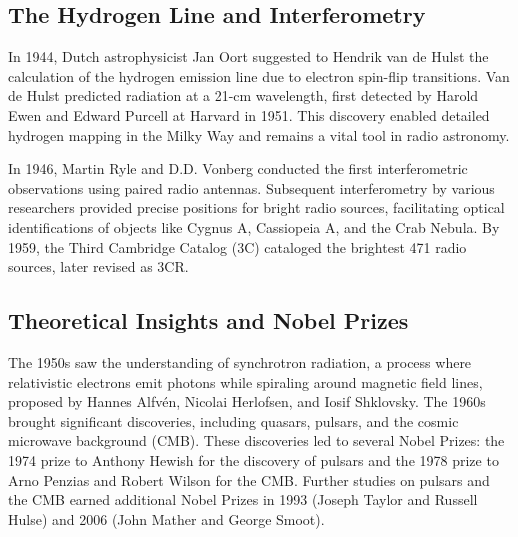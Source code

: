 \subsection{The Hydrogen Line and Interferometry}

In 1944, Dutch astrophysicist Jan Oort suggested to Hendrik van de Hulst the calculation of the hydrogen emission line due to electron spin-flip transitions. Van de Hulst predicted radiation at a 21-cm wavelength, first detected by Harold Ewen and Edward Purcell at Harvard in 1951. This discovery enabled detailed hydrogen mapping in the Milky Way and remains a vital tool in radio astronomy.

In 1946, Martin Ryle and D.D. Vonberg conducted the first interferometric observations using paired radio antennas. Subsequent interferometry by various researchers provided precise positions for bright radio sources, facilitating optical identifications of objects like Cygnus A, Cassiopeia A, and the Crab Nebula. By 1959, the Third Cambridge Catalog (3C) cataloged the brightest 471 radio sources, later revised as 3CR.

\subsection{Theoretical Insights and Nobel Prizes}

The 1950s saw the understanding of synchrotron radiation, a process where relativistic electrons emit photons while spiraling around magnetic field lines, proposed by Hannes Alfvén, Nicolai Herlofsen, and Iosif Shklovsky. The 1960s brought significant discoveries, including quasars, pulsars, and the cosmic microwave background (CMB). These discoveries led to several Nobel Prizes: the 1974 prize to Anthony Hewish for the discovery of pulsars and the 1978 prize to Arno Penzias and Robert Wilson for the CMB. Further studies on pulsars and the CMB earned additional Nobel Prizes in 1993 (Joseph Taylor and Russell Hulse) and 2006 (John Mather and George Smoot).
